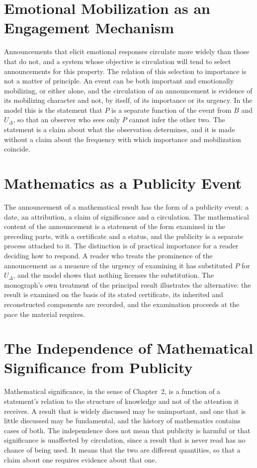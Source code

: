 \documentclass[11pt,letterpaper]{report}
\theoremstyle{plain}
\theoremstyle{definition}
\theoremstyle{remark}
\begin{document}
\section{Emotional Mobilization as an Engagement Mechanism}

Announcements that elicit emotional responses circulate more widely than those that do not, and a system whose objective is circulation will tend to select announcements for this property. The relation of this selection to importance is not a matter of principle. An event can be both important and emotionally mobilizing, or either alone, and the circulation of an announcement is evidence of its mobilizing character and not, by itself, of its importance or its urgency. In the model this is the statement that $P$ is a separate function of the event from $B$ and $U_\Delta$, so that an observer who sees only $P$ cannot infer the other two. The statement is a claim about what the observation determines, and it is made without a claim about the frequency with which importance and mobilization coincide.

\section{Mathematics as a Publicity Event}

The announcement of a mathematical result has the form of a publicity event: a date, an attribution, a claim of significance and a circulation. The mathematical content of the announcement is a statement of the form examined in the preceding parts, with a certificate and a status, and the publicity is a separate process attached to it. The distinction is of practical importance for a reader deciding how to respond. A reader who treats the prominence of the announcement as a measure of the urgency of examining it has substituted $P$ for $U_\Delta$, and the model shows that nothing licenses the substitution. The monograph's own treatment of the principal result illustrates the alternative: the result is examined on the basis of its stated certificate, its inherited and reconstructed components are recorded, and the examination proceeds at the pace the material requires.

\section{The Independence of Mathematical Significance from Publicity}

Mathematical significance, in the sense of Chapter~2, is a function of a statement's relation to the structure of knowledge and not of the attention it receives. A result that is widely discussed may be unimportant, and one that is little discussed may be fundamental, and the history of mathematics contains cases of both. The independence does not mean that publicity is harmful or that significance is unaffected by circulation, since a result that is never read has no chance of being used. It means that the two are different quantities, so that a claim about one requires evidence about that one.
\end{document}
